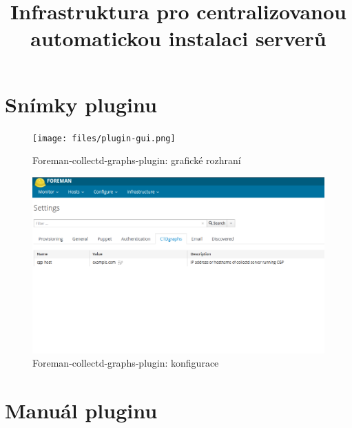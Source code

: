 \documentclass[thesis=B,czech]{FITthesis}[2017/05/04]
\title{Infrastruktura pro centralizovanou automatickou instalaci serverů}
\begin{document}









%




\appendix

\chapter{Snímky pluginu}

\begin{figure}[h]\centering
\texttt{[image: files/plugin-gui.png]}
	\caption{Foreman-collectd-graphs-plugin: grafické rozhraní }\label{fig:float}
\end{figure}

\begin{figure}[h]\centering
\includegraphics[width=\textwidth]{files/plugin-config.png}
	\caption{Foreman-collectd-graphs-plugin: konfigurace }\label{fig:float}
\end{figure}


\chapter{Manuál pluginu}
\end{document}

